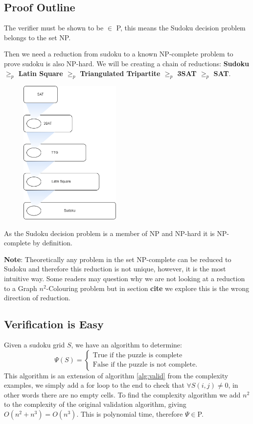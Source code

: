 \documentclass[a4paper,11pt]{report}
\begin{document}
\subsection{Proof Outline}

The verifier must be shown to be $\in$ P, this means the Sudoku decision problem belongs to the set NP.

Then we need a reduction from sudoku to a known NP-complete problem to prove sudoku is also NP-hard. We will be creating a chain of reductions: \textbf{Sudoku $\geq_p$ Latin Square $\geq_p$ Triangulated Tripartite $\geq_p$ 3SAT $\geq_p$ SAT}.

\begin{figure}[h!]
	\begin{center}
		\includegraphics[width=50mm]{figures/subset.png}
	\end{center}
	\caption{\label{fig:sudokureduction}}
\end{figure}

As the Sudoku decision problem is a member of NP and NP-hard it is NP-complete by definition.

\textbf{Note}: Theoretically any problem in the set NP-complete can be reduced to Sudoku and therefore this reduction is not unique, however, it is the most intuitive way. Some readers may question why we are not looking at a reduction to a Graph
$n^2$-Colouring problem but in section \textbf{cite} we explore this is the wrong direction of reduction.

\subsection{Verification is Easy}

Given a sudoku grid $S$, we have an algorithm to determine:
		\begin{equation}
			\Psi(S) = \begin{cases}	
				\text{True if the puzzle is complete} \\
				\text{False if the puzzle is not complete}.
			\end{cases}
		\end{equation}
This algorithm is an extension of algorithm \ref{alg:valid} from the complexity examples, we simply add a for loop to the end to check that $\forall S(i,j) \neq 0 $, in other words there are no empty cells. To find the complexity algorithm we add $n^2$ to the complexity of the original validation algorithm, giving $O(n^2+n^3)=O(n^3)$. This is polynomial time, therefore $\Psi\in $P.
\end{document}
